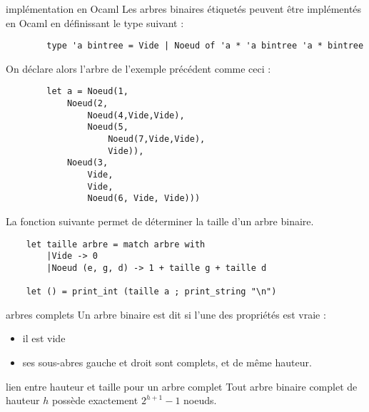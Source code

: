 \begin{exemple}{7.8}{implémentation en Ocaml}
    Les arbres binaires étiquetés peuvent être implémentés en Ocaml en définissant le type suivant :
    \begin{verbatim}
        type 'a bintree = Vide | Noeud of 'a * 'a bintree 'a * bintree
    \end{verbatim}
    On déclare alors l'arbre de l'exemple précédent comme ceci : 
    \begin{verbatim}
        let a = Noeud(1,
            Noeud(2,
                Noeud(4,Vide,Vide),
                Noeud(5,
                    Noeud(7,Vide,Vide),
                    Vide)),
            Noeud(3,
                Vide,
                Vide, 
                Noeud(6, Vide, Vide)))
    \end{verbatim}
    La fonction suivante permet de déterminer la taille d'un arbre binaire.
    \begin{verbatim}
    let taille arbre = match arbre with
        |Vide -> 0
        |Noeud (e, g, d) -> 1 + taille g + taille d

    let () = print_int (taille a ; print_string "\n")
    \end{verbatim}
\end{exemple}

\begin{definition}{7.9}{arbres complets}
    Un arbre binaire est dit  si l'une des propriétés est vraie : \begin{itemize}
        \item il est vide
        \item ses sous-abres gauche et droit sont complets, et de même hauteur.
    \end{itemize}
    
\end{definition}

\begin{proposition}{7.10}{lien entre hauteur et taille pour un arbre complet}
    Tout arbre binaire complet de hauteur $h$ possède exactement $2^{h+1} - 1$ noeuds.
\end{proposition}

